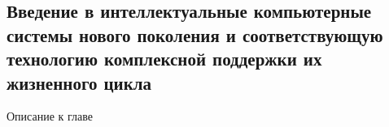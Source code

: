 \begin{partbacktext}
\part{Введение в интеллектуальные компьютерные системы нового поколения и соответствующую технологию комплексной поддержки их жизненного цикла}
\noindent Описание к главе
\end{partbacktext}



